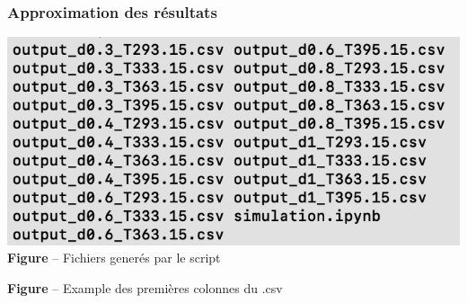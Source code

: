 \documentclass{beamer}
\begin{document}
\begin{frame}
\frametitle{Approximation des résultats}
\centering
\begin{minipage}{0.48\textwidth}
    \centering
    \includegraphics[width=\linewidth]{Fig/stefan-fichiers.png}
    \textbf{Figure} -- Fichiers generés par le script
\end{minipage}
\hfill
\begin{minipage}{0.48\textwidth}
    \centering
        
        \textbf{Figure} -- Example des premières colonnes du .csv
\end{minipage}
\end{frame}
\end{document}
